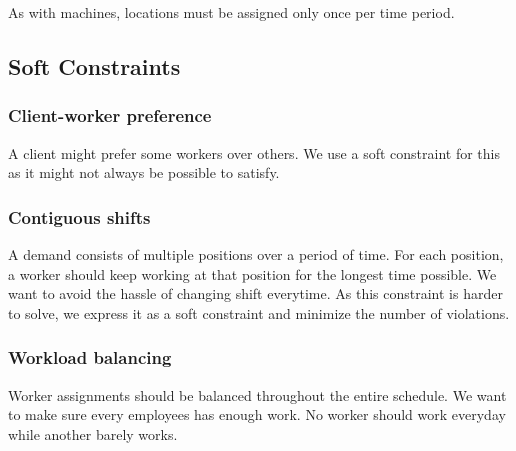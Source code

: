\documentclass[../thesis.tex]{subfiles}
\begin{document}
As with machines, locations must be assigned only once per time period.




\subsection{Soft Constraints}

\subsubsection{Client-worker preference}

A client might prefer some workers over others. 
We use a soft constraint for this as it might not always be possible to 
satisfy.

\subsubsection{Contiguous shifts}

A demand consists of multiple positions over a period of time. 
For each position, a worker should keep working at that position for the longest time possible. 
We want to avoid the hassle of changing shift everytime. 
As this constraint is harder to solve, we express it as a soft constraint and minimize the number of 
violations.

\subsubsection{Workload balancing}

Worker assignments should be balanced throughout the entire schedule.
We want to make sure every employees has enough work.
No worker should work everyday while another barely works.
\end{document}
